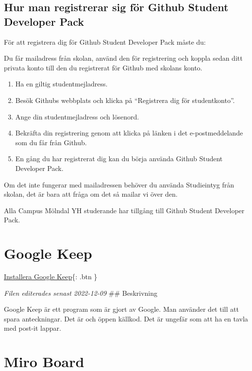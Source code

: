 \hypertarget{hur-man-registrerar-sig-fuxf6r-github-student-developer-pack}{%
\subsection{Hur man registrerar sig för Github Student Developer
Pack}\label{hur-man-registrerar-sig-fuxf6r-github-student-developer-pack}}

För att registrera dig för Github Student Developer Pack måste du:

Du får mailadress från skolan, använd den för registrering och koppla
sedan ditt privata konto till den du registrerat för Github med skolans
konto.

\begin{enumerate}
\def\labelenumi{\arabic{enumi}.}
\tightlist
\item
  Ha en giltig studentmejladress.
\item
  Besök Githubs webbplats och klicka på ``Registrera dig för
  studentkonto''.
\item
  Ange din studentmejladress och lösenord.
\item
  Bekräfta din registrering genom att klicka på länken i det
  e-postmeddelande som du får från Github.
\item
  En gång du har registrerat dig kan du börja använda Github Student
  Developer Pack.
\end{enumerate}

Om det inte fungerar med mailadressen behöver du använda Studieintyg
från skolan, det är bara att fråga om det så mailar vi över den.

Alla Campus Mölndal YH studerande har tillgång till Github Student
Developer Pack.

\hypertarget{google-keep}{%
\section{Google Keep}\label{google-keep}}

\href{https://keep.google.com/}{Installera Google Keep}\{: .btn \}

\emph{Filen editerades senast 2022-12-09} \#\# Beskrivning

Google Keep är ett program som är gjort av Google. Man använder det till
att spara anteckningar. Det är och öppen källkod. Det är ungefär som att
ha en tavla med post-it lappar.

\hypertarget{miro-board}{%
\section{Miro Board}\label{miro-board}}


